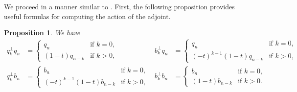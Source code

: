 \documentclass[12pt]{amsart}%
\newtheorem{proposition}[theorem]{Proposition}
\newtheorem{lemma}[theorem]{Lemma}
\theoremstyle{remark}
\theoremstyle{definition}
\newcommand{\Z}{\mathbb{Z}}
\begin{document}

    We proceed in a manner similar to \cite[p.~236-238]{macdonald:1995}. First, the following proposition provides useful formulas for computing the action of the adjoint.

    \begin{proposition}
        We have
        \begin{align*}
            q_k^\perp q_n&=
                \begin{cases}
                    q_n&\text{if }k=0,\\
                    (1-t)q_{n-k}&\text{if }k>0,
                \end{cases}&
            b_k^\perp q_n&=
                \begin{cases}
                    q_n&\text{if }k=0,\\
                    (-t)^{k-1}(1-t)q_{n-k}&\text{if }k>0,
                \end{cases}\\
            q_k^\perp b_n&=
                \begin{cases}
                    b_n&\text{if }k=0,\\
                    (-t)^{k-1}(1-t)b_{n-k}&\text{if }k>0,
                \end{cases}&
            b_k^\perp b_n&=
                \begin{cases}
                    b_n&\text{if }k=0,\\
                    (1-t)b_{n-k}&\text{if }k>0.
                \end{cases}
        \end{align*}

\end{proposition}
\end{document}
